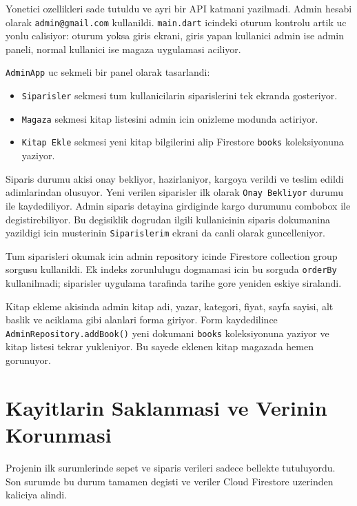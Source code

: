 \documentclass[12pt,a4paper]{article}
\begin{document}
Yonetici ozellikleri sade tutuldu ve ayri bir API katmani yazilmadi. Admin hesabi olarak \verb|admin@gmail.com| kullanildi. \verb|main.dart| icindeki oturum kontrolu artik uc yonlu calisiyor: oturum yoksa giris ekrani, giris yapan kullanici admin ise admin paneli, normal kullanici ise magaza uygulamasi aciliyor.

\verb|AdminApp| uc sekmeli bir panel olarak tasarlandi:

\begin{itemize}
  \item \verb|Siparisler| sekmesi tum kullanicilarin siparislerini tek ekranda gosteriyor.
  \item \verb|Magaza| sekmesi kitap listesini admin icin onizleme modunda actiriyor.
  \item \verb|Kitap Ekle| sekmesi yeni kitap bilgilerini alip Firestore \verb|books| koleksiyonuna yaziyor.
\end{itemize}

Siparis durumu akisi onay bekliyor, hazirlaniyor, kargoya verildi ve teslim edildi adimlarindan olusuyor. Yeni verilen siparisler ilk olarak \verb|Onay Bekliyor| durumu ile kaydediliyor. Admin siparis detayina girdiginde kargo durumunu combobox ile degistirebiliyor. Bu degisiklik dogrudan ilgili kullanicinin siparis dokumanina yazildigi icin musterinin \verb|Siparislerim| ekrani da canli olarak guncelleniyor.

Tum siparisleri okumak icin admin repository icinde Firestore collection group sorgusu kullanildi. Ek indeks zorunlulugu dogmamasi icin bu sorguda \verb|orderBy| kullanilmadi; siparisler uygulama tarafinda tarihe gore yeniden eskiye siralandi.

Kitap ekleme akisinda admin kitap adi, yazar, kategori, fiyat, sayfa sayisi, alt baslik ve aciklama gibi alanlari forma giriyor. Form kaydedilince \verb|AdminRepository.addBook()| yeni dokumani \verb|books| koleksiyonuna yaziyor ve kitap listesi tekrar yukleniyor. Bu sayede eklenen kitap magazada hemen gorunuyor.

\section{Kayitlarin Saklanmasi ve Verinin Korunmasi}

Projenin ilk surumlerinde sepet ve siparis verileri sadece bellekte tutuluyordu. Son surumde bu durum tamamen degisti ve veriler Cloud Firestore uzerinden kaliciya alindi.
\end{document}
